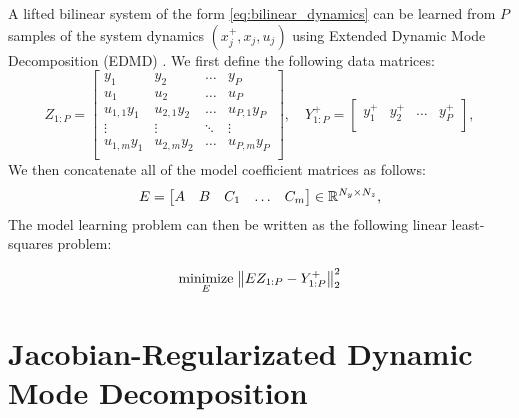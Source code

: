 \documentclass[../root.tex]{subfiles}
\begin{document}
A lifted bilinear system of the form \eqref{eq:bilinear_dynamics} can be learned
from $P$ samples of the system dynamics $(x_j^+,x_j,u_j)$ using Extended Dynamic
Mode Decomposition (EDMD) \cite{williams_Data_2015,folkestad_Koopman_2021}. We
first define the following data matrices:
\begin{equation}
  Z_{1:P} = \begin{bmatrix}
    y_1         & y_2         & \dots  & y_P          \\
    u_1         & u_2         & \dots  & u_P          \\
    u_{1,1} y_1 & u_{2,1} y_2 & \dots  & u_{P,1} y_P  \\
    \vdots      & \vdots      & \ddots & \vdots       \\
    u_{1,m} y_1 & u_{2,m} y_2 & \dots  & u_{P,m} y_P  \\
  \end{bmatrix}, \quad 
  Y_{1:P}^+ = \begin{bmatrix}
    y_1^+         & y_2^+         & \dots  & y_P^+    \\
  \end{bmatrix},
\end{equation}
We then concatenate all of the model coefficient matrices as follows:
\begin{equation} \label{eq:E_matrixdef}
  E = \begin{bmatrix} A & B & C_1 & \dots & C_m \end{bmatrix} \in \mathbb{R}^{N_y \times N_z},
\end{equation}
The model learning problem can then be written as the following linear least-squares problem:

\begin{align} \label{opt:edmd}
  \underset{E}{\text{minimize}} \; \norm{E Z_{1:P} - Y_{1:P}^+}_2^2
\end{align}



\section{Jacobian-Regularizated Dynamic Mode Decomposition} \label{sec:jdmd}
\end{document}
